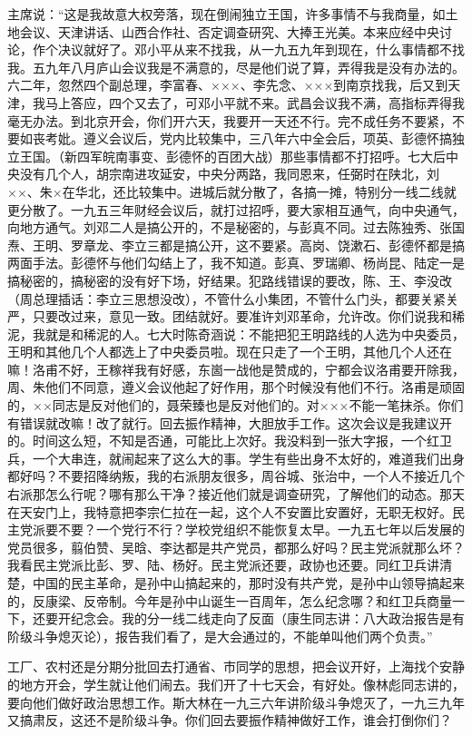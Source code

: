 主席说：“这是我故意大权旁落，现在倒闹独立王国，许多事情不与我商量，如土地会议、天津讲话、山西合作社、否定调查研究、大捧王光美。本来应经中央讨论，作个决议就好了。邓小平从来不找我，从一九五九年到现在，什么事情都不找我。五九年八月庐山会议我是不满意的，尽是他们说了算，弄得我是没有办法的。六二年，忽然四个副总理，李富春、×××、李先念、×××到南京找我，后又到天津，我马上答应，四个又去了，可邓小平就不来。武昌会议我不满，高指标弄得我毫无办法。到北京开会，你们开六天，我要开一天还不行。完不成任务不要紧，不要如丧考妣。遵义会议后，党内比较集中，三八年六中全会后，项英、彭德怀搞独立王国。（新四军皖南事变、彭德怀的百团大战）那些事情都不打招呼。七大后中央没有几个人，胡宗南进攻延安，中央分两路，我同恩来，任弼时在陕北，刘××、朱×在华北，还比较集中。进城后就分散了，各搞一摊，特别分一线二线就更分散了。一九五三年财经会议后，就打过招呼，要大家相互通气，向中央通气，向地方通气。刘邓二人是搞公开的，不是秘密的，与彭真不同。过去陈独秀、张国焘、王明、罗章龙、李立三都是搞公开，这不要紧。高岗、饶漱石、彭德怀都是搞两面手法。彭德怀与他们勾结上了，我不知道。彭真、罗瑞卿、杨尚昆、陆定一是搞秘密的，搞秘密的没有好下场，好结果。犯路线错误的要改，陈、王、李没改（周总理插话：李立三思想没改），不管什么小集团，不管什么门头，都要关紧关严，只要改过来，意见一致。团结就好。要准许刘邓革命，允许改。你们说我和稀泥，我就是和稀泥的人。七大时陈奇涵说：不能把犯王明路线的人选为中央委员，王明和其他几个人都选上了中央委员啦。现在只走了一个王明，其他几个人还在嘛！洛甫不好，王稼祥我有好感，东崮一战他是赞成的，宁都会议洛甫要开除我，周、朱他们不同意，遵义会议他起了好作用，那个时候没有他们不行。洛甫是顽固的，××同志是反对他们的，聂荣臻也是反对他们的。对×××不能一笔抹杀。你们有错误就改嘛！改了就行。回去振作精神，大胆放手工作。这次会议是我建议开的。时间这么短，不知是否通，可能比上次好。我没料到一张大字报，一个红卫兵，一个大串连，就闹起来了这么大的事。学生有些出身不太好的，难道我们出身都好吗？不要招降纳叛，我的右派朋友很多，周谷城、张治中，一个人不接近几个右派那怎么行呢？哪有那么干净？接近他们就是调查研究，了解他们的动态。那天在天安门上，我特意把李宗仁拉在一起，这个人不安置比安置好，无职无权好。民主党派要不要？一个党行不行？学校党组织不能恢复太早。一九五七年以后发展的党员很多，翦伯赞、吴晗、李达都是共产党员，都那么好吗？民主党派就那么坏？我看民主党派比彭、罗、陆、杨好。民主党派还要，政协也还要。同红卫兵讲清楚，中国的民主革命，是孙中山搞起来的，那时没有共产党，是孙中山领导搞起来的，反康梁、反帝制。今年是孙中山诞生一百周年，怎么纪念哪？和红卫兵商量一下，还要开纪念会。我的分一线二线走向了反面（康生同志讲：八大政治报告是有阶级斗争熄灭论），报告我们看了，是大会通过的，不能单叫他们两个负责。”

工厂、农村还是分期分批回去打通省、市同学的思想，把会议开好，上海找个安静的地方开会，学生就让他们闹去。我们开了十七天会，有好处。像林彪同志讲的，要向他们做好政治思想工作。斯大林在一九三六年讲阶级斗争熄灭了，一九三九年又搞肃反，这还不是阶级斗争。你们回去要振作精神做好工作，谁会打倒你们？

